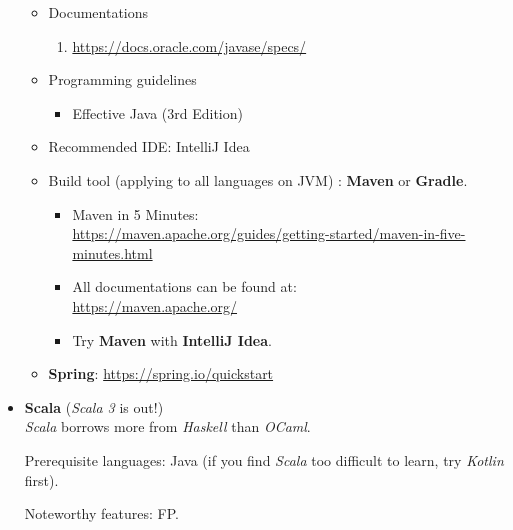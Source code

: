\documentclass{article}
\begin{document}
\begin{itemize}
\begin{itemize}
\begin{enumerate}
        \end{enumerate}
        \item Documentations
        \begin{enumerate}
            \item \href{https://docs.oracle.com/javase/specs/}{https://docs.oracle.com/javase/specs/}
        \end{enumerate}
        \item Programming guidelines
        \begin{itemize}
            \item Effective Java (3rd Edition) \cite{bloch2008effective}
        \end{itemize}

        \item Recommended IDE: IntelliJ Idea
        \item Build tool (applying to all languages on JVM) : \textbf{Maven} or \textbf{Gradle}.
        \begin{itemize}
            \item Maven in 5 Minutes:\\
            \href{https://maven.apache.org/guides/getting-started/maven-in-five-minutes.html}{https://maven.apache.org/guides/getting-started/maven-in-five-minutes.html}
            \item All documentations can be found at:\\
            \href{https://maven.apache.org/}{https://maven.apache.org/}
            \item Try \textbf{Maven} with \textbf{IntelliJ Idea}.
        \end{itemize}
        \item \textbf{Spring}:
        \href{https://spring.io/quickstart}{https://spring.io/quickstart}
    \end{itemize}

    \item \textbf{Scala} (\emph{Scala 3} is out!)\\
    
    \emph{Scala} borrows more from \emph{Haskell} than \emph{OCaml}.
    
    Prerequisite languages: Java (if you find \emph{Scala} too difficult to learn, try \emph{Kotlin} first).
    
    Noteworthy features: FP.
    

\end{itemize}
\end{document}
